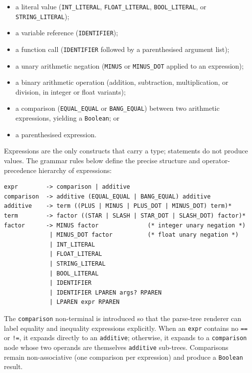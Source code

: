 \begin{itemize}
  \item a literal value (\texttt{INT\_LITERAL}, \texttt{FLOAT\_LITERAL},
        \texttt{BOOL\_LITERAL}, or \texttt{STRING\_LITERAL});
  \item a variable reference (\texttt{IDENTIFIER});
  \item a function call (\texttt{IDENTIFIER} followed by a parenthesised
        argument list);
  \item a unary arithmetic negation (\texttt{MINUS} or \texttt{MINUS\_DOT}
        applied to an expression);
  \item a binary arithmetic operation (addition, subtraction, multiplication,
        or division, in integer or float variants);
  \item a comparison (\texttt{EQUAL\_EQUAL} or \texttt{BANG\_EQUAL}) between
        two arithmetic expressions, yielding a \texttt{Boolean}; or
  \item a parenthesised expression.
\end{itemize}

\noindent Expressions are the only constructs that carry a type; statements do
not produce values. The grammar rules below define the precise structure and
operator-precedence hierarchy of expressions:

\begin{lstlisting}
expr        -> comparison | additive
comparison  -> additive (EQUAL_EQUAL | BANG_EQUAL) additive
additive    -> term ((PLUS | MINUS | PLUS_DOT | MINUS_DOT) term)*
term        -> factor ((STAR | SLASH | STAR_DOT | SLASH_DOT) factor)*
factor      -> MINUS factor              (* integer unary negation *)
             | MINUS_DOT factor          (* float unary negation *)
             | INT_LITERAL
             | FLOAT_LITERAL
             | STRING_LITERAL
             | BOOL_LITERAL
             | IDENTIFIER
             | IDENTIFIER LPAREN args? RPAREN
             | LPAREN expr RPAREN
\end{lstlisting}

The \texttt{comparison} non-terminal is introduced so that the parse-tree
renderer can label equality and inequality expressions explicitly. When an
\texttt{expr} contains no \texttt{==} or \texttt{!=}, it expands directly to an
\texttt{additive}; otherwise, it expands to a \texttt{comparison} node whose
two operands are themselves \texttt{additive} sub-trees. Comparisons remain
non-associative (one comparison per expression) and produce a
\texttt{Boolean} result.


